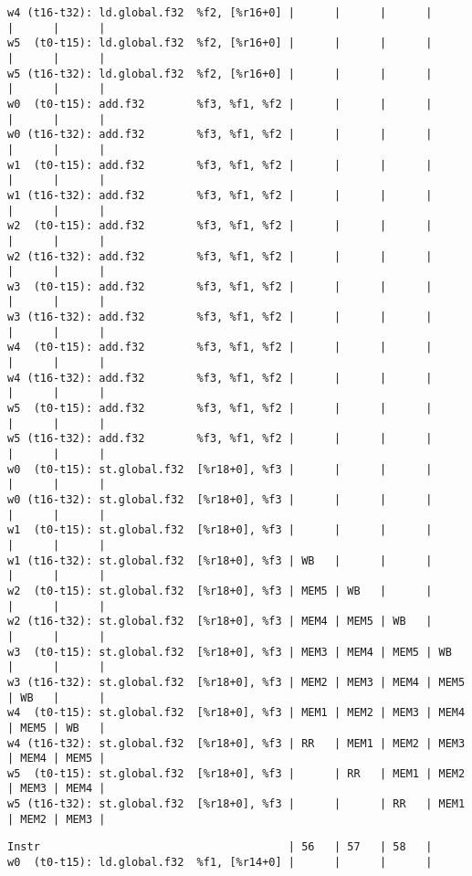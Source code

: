 \documentclass[11pt]{article}
\begin{document}
\begin{Answer}
\begin{verbatim}
w4 (t16-t32): ld.global.f32  %f2, [%r16+0] |      |      |      |      |      |      |
w5  (t0-t15): ld.global.f32  %f2, [%r16+0] |      |      |      |      |      |      |
w5 (t16-t32): ld.global.f32  %f2, [%r16+0] |      |      |      |      |      |      |
w0  (t0-t15): add.f32        %f3, %f1, %f2 |      |      |      |      |      |      |
w0 (t16-t32): add.f32        %f3, %f1, %f2 |      |      |      |      |      |      |
w1  (t0-t15): add.f32        %f3, %f1, %f2 |      |      |      |      |      |      |
w1 (t16-t32): add.f32        %f3, %f1, %f2 |      |      |      |      |      |      |
w2  (t0-t15): add.f32        %f3, %f1, %f2 |      |      |      |      |      |      |
w2 (t16-t32): add.f32        %f3, %f1, %f2 |      |      |      |      |      |      |
w3  (t0-t15): add.f32        %f3, %f1, %f2 |      |      |      |      |      |      |
w3 (t16-t32): add.f32        %f3, %f1, %f2 |      |      |      |      |      |      |
w4  (t0-t15): add.f32        %f3, %f1, %f2 |      |      |      |      |      |      |
w4 (t16-t32): add.f32        %f3, %f1, %f2 |      |      |      |      |      |      |
w5  (t0-t15): add.f32        %f3, %f1, %f2 |      |      |      |      |      |      |
w5 (t16-t32): add.f32        %f3, %f1, %f2 |      |      |      |      |      |      |
w0  (t0-t15): st.global.f32  [%r18+0], %f3 |      |      |      |      |      |      |
w0 (t16-t32): st.global.f32  [%r18+0], %f3 |      |      |      |      |      |      |
w1  (t0-t15): st.global.f32  [%r18+0], %f3 |      |      |      |      |      |      |
w1 (t16-t32): st.global.f32  [%r18+0], %f3 | WB   |      |      |      |      |      |
w2  (t0-t15): st.global.f32  [%r18+0], %f3 | MEM5 | WB   |      |      |      |      |
w2 (t16-t32): st.global.f32  [%r18+0], %f3 | MEM4 | MEM5 | WB   |      |      |      |
w3  (t0-t15): st.global.f32  [%r18+0], %f3 | MEM3 | MEM4 | MEM5 | WB   |      |      |
w3 (t16-t32): st.global.f32  [%r18+0], %f3 | MEM2 | MEM3 | MEM4 | MEM5 | WB   |      |
w4  (t0-t15): st.global.f32  [%r18+0], %f3 | MEM1 | MEM2 | MEM3 | MEM4 | MEM5 | WB   |
w4 (t16-t32): st.global.f32  [%r18+0], %f3 | RR   | MEM1 | MEM2 | MEM3 | MEM4 | MEM5 |
w5  (t0-t15): st.global.f32  [%r18+0], %f3 |      | RR   | MEM1 | MEM2 | MEM3 | MEM4 |
w5 (t16-t32): st.global.f32  [%r18+0], %f3 |      |      | RR   | MEM1 | MEM2 | MEM3 |
\end{verbatim}
\newpage
\begin{verbatim}
Instr                                      | 56   | 57   | 58   |
w0  (t0-t15): ld.global.f32  %f1, [%r14+0] |      |      |      | 

\end{verbatim}
\end{Answer}
\end{document}
